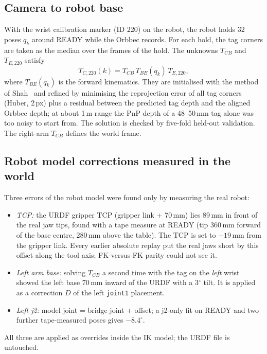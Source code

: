 \documentclass[conference,10pt]{IEEEtran}
\newcommand{\mm}{\,mm\xspace}
\begin{document}
\subsection{Camera to robot base}\label{sec:camrobot}
With the wrist calibration marker (ID 220) on the robot, the robot holds 32 poses $q_k$ around READY while the Orbbec records. For each hold, the tag
corners are taken as the median over the frames of the hold. The unknowns $T_{CB}$ and $T_{E,220}$ satisfy
\begin{equation}
T_{C,220}(k)=T_{CB}\,T_{BE}(q_k)\,T_{E,220},
\end{equation}
where $T_{BE}(q_k)$ is the forward kinematics. They are initialised with the method of Shah~\cite{shah2013robotworld} and
refined by minimising the reprojection error of all tag corners (Huber, 2\,px) plus a residual between the predicted tag
depth and the aligned Orbbec depth; at about 1\,m range the PnP depth of a 48--50\mm tag alone was too noisy to start from. The
solution is checked by five-fold held-out validation. The right-arm $T_{CB}$ defines the world frame.

\subsection{Robot model corrections measured in the world}\label{sec:corr}
Three errors of the robot model were found only by measuring the real robot:
\begin{itemize}
\item \emph{TCP:} the URDF gripper TCP (gripper link + 70\mm) lies 89\mm in front of the real jaw tips, found with a tape
  measure at READY (tip 360\mm forward of the base centre, 280\mm above the table). The TCP is set to $-19$\mm from the
  gripper link. Every earlier absolute replay put the real jaws short by this offset along the tool axis; FK-versus-FK parity could not see it.
\item \emph{Left arm base:} solving $T_{CB}$ a second time with the tag on the \emph{left} wrist showed the left base 70\mm
  inward of the URDF with a 3$^\circ$ tilt. It is applied as a correction $D$ of the left \texttt{joint1} placement.
\item \emph{Left j2:} model joint = bridge joint + offset; a j2-only fit on READY and two further tape-measured poses gives
  $-8.4^\circ$.
\end{itemize}
All three are applied as overrides inside the IK model; the URDF file is untouched.
\end{document}

